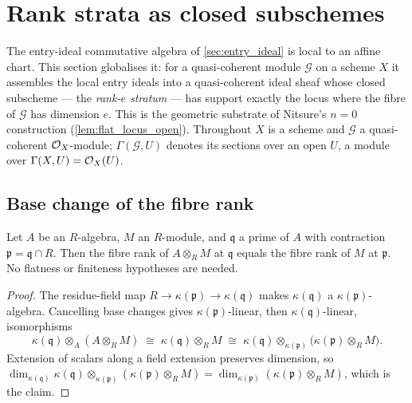 \section{Rank strata as closed subschemes}
\label{sec:flatstrat_rank_stratum}

The entry-ideal commutative algebra of \cref{sec:entry_ideal} is local to an
affine chart.  This section globalises it: for a quasi-coherent module
\(\mathcal G\) on a scheme \(X\) it assembles the local entry ideals into a
quasi-coherent ideal sheaf whose closed subscheme --- the \emph{rank-\(e\)
stratum} --- has support exactly the locus where the fibre of \(\mathcal G\)
has dimension \(e\).  This is the geometric substrate of Nitsure's
\(n = 0\) construction (\cref{lem:flat_locus_open}).  Throughout \(X\) is a
scheme and \(\mathcal G\) a quasi-coherent \(\mathcal{O}_X\)-module; \(\Gamma(\mathcal G, U)\)
denotes its sections over an open \(U\), a module over \(\Gamma(X, U) = \mathcal{O}_X(U)\).

\subsection{Base change of the fibre rank}

\begin{theorem}
  \label{thm:fiber_rank_base_change}
  \leanok
  Let \(A\) be an \(R\)-algebra, \(M\) an \(R\)-module, and \(\mathfrak q\) a
  prime of \(A\) with contraction \(\mathfrak p = \mathfrak q \cap R\).  Then
  the fibre rank of \(A \otimes_R M\) at \(\mathfrak q\) equals the fibre rank
  of \(M\) at \(\mathfrak p\).  No flatness or finiteness hypotheses are
  needed.
\end{theorem}

\begin{proof}
  \leanok
  The residue-field map \(R \to \kappa(\mathfrak p) \to \kappa(\mathfrak q)\)
  makes \(\kappa(\mathfrak q)\) a \(\kappa(\mathfrak p)\)-algebra.  Cancelling
  base changes gives \(\kappa(\mathfrak p)\)-linear, then
  \(\kappa(\mathfrak q)\)-linear, isomorphisms
  \[
    \kappa(\mathfrak q) \otimes_A (A \otimes_R M)
      \;\cong\; \kappa(\mathfrak q) \otimes_R M
      \;\cong\; \kappa(\mathfrak q) \otimes_{\kappa(\mathfrak p)}
        \bigl(\kappa(\mathfrak p) \otimes_R M\bigr).
  \]
  Extension of scalars along a field extension preserves dimension, so
  \(\dim_{\kappa(\mathfrak q)}
    \kappa(\mathfrak q) \otimes_{\kappa(\mathfrak p)}
    (\kappa(\mathfrak p) \otimes_R M)
    = \dim_{\kappa(\mathfrak p)}(\kappa(\mathfrak p) \otimes_R M)\),
  which is the claim.
\end{proof}

